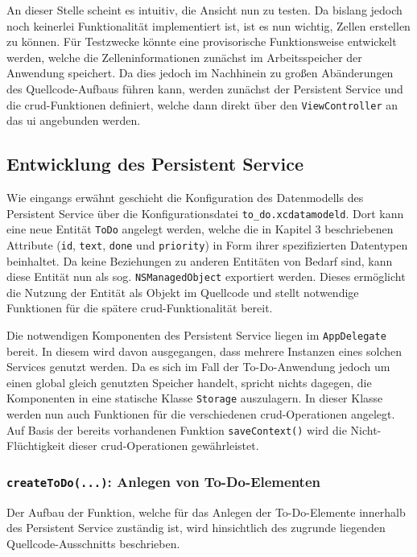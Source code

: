 An dieser Stelle scheint es intuitiv, die Ansicht nun zu testen. Da bislang jedoch noch keinerlei Funktionalität implementiert ist, ist es nun wichtig, Zellen erstellen zu können. Für Testzwecke könnte eine provisorische Funktionsweise entwickelt werden, welche die Zelleninformationen zunächst im Arbeitsspeicher der Anwendung speichert. Da dies jedoch im Nachhinein zu großen Abänderungen des Quellcode-Aufbaus führen kann, werden zunächst der Persistent Service und die \ac{crud}-Funktionen definiert, welche dann direkt über den \texttt{ViewController} an das \ac{ui} angebunden werden.

\subsection{Entwicklung des Persistent Service}
Wie eingangs erwähnt geschieht die Konfiguration des Datenmodells des Persistent Service über die Konfigurationsdatei \texttt{to\_do.xcdatamodeld}. Dort kann eine neue Entität \texttt{ToDo} angelegt werden, welche die in Kapitel 3 beschriebenen Attribute (\texttt{id}, \texttt{text}, \texttt{done} und \texttt{priority}) in Form ihrer spezifizierten Datentypen beinhaltet. Da keine Beziehungen zu anderen Entitäten von Bedarf sind, kann diese Entität nun als sog. \texttt{NSManagedObject} exportiert werden. Dieses ermöglicht die Nutzung der Entität als Objekt im Quellcode und stellt notwendige Funktionen für die spätere \ac{crud}-Funktionalität bereit.

Die notwendigen Komponenten des Persistent Service liegen im \texttt{AppDelegate} bereit. In diesem wird davon ausgegangen, dass mehrere Instanzen eines solchen Services genutzt werden. Da es sich im Fall der To-Do-Anwendung jedoch um einen global gleich genutzten Speicher handelt, spricht nichts dagegen, die Komponenten in eine statische Klasse \texttt{Storage} auszulagern. In dieser Klasse werden nun auch Funktionen für die verschiedenen \ac{crud}-Operationen angelegt. Auf Basis der bereits vorhandenen Funktion \texttt{saveContext()} wird die Nicht-Flüchtigkeit dieser \ac{crud}-Operationen gewährleistet.

\subsubsection{\texttt{createToDo(...)}: Anlegen von To-Do-Elementen}
Der Aufbau der Funktion, welche für das Anlegen der To-Do-Elemente innerhalb des Persistent Service zuständig ist, wird hinsichtlich des zugrunde liegenden Quellcode-Ausschnitts beschrieben.


